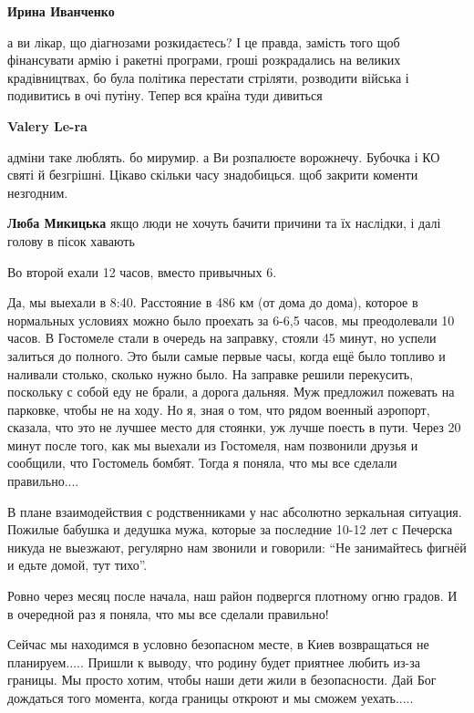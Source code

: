 \begin{itemize}
\begin{itemize}
\textbf{Ирина Иванченко} 

а ви лікар, що діагнозами розкидаєтесь? І це правда, замість того щоб
фінансувати армію і ракетні програми, гроші розкрадались на великих
крадівництвах, бо була політика перестати стріляти, розводити війська і
подивитись в очі путіну. Тепер вся країна туди дивиться

\textbf{Valery Le-ra} 

адміни таке люблять. бо мирумир. а Ви розпалюєте ворожнечу. Бубочка і КО святі й
безгрішні. Цікаво скільки часу знадобицься. щоб закрити коменти незгодним.

\textbf{Люба Микицька} якщо люди не хочуть бачити причини та їх наслідки, і далі голову в пісок хавають
\end{itemize} %

Во второй ехали 12 часов, вместо привычных 6.


Да, мы выехали в 8:40. Расстояние в 486 км (от дома до дома), которое в
нормальных условиях можно было проехать за 6-6,5 часов, мы преодолевали 10
часов. В Гостомеле стали в очередь на заправку, стояли 45 минут, но успели
залиться до полного. Это были самые первые часы, когда ещё было топливо и
наливали столько, сколько нужно было. На заправке решили перекусить, поскольку
с собой еду не брали, а дорога дальняя. Муж предложил пожевать на парковке,
чтобы не на ходу. Но я, зная о том, что рядом военный аэропорт, сказала, что
это не лучшее место для стоянки, уж лучше поесть в пути. Через 20 минут после
того, как мы выехали из Гостомеля, нам позвонили друзья и сообщили, что
Гостомель бомбят. Тогда я поняла, что мы все сделали правильно....

В плане взаимодействия с родственниками у нас абсолютно зеркальная ситуация.
Пожилые бабушка и дедушка мужа, которые за последние 10-12 лет с Печерска
никуда не выезжают, регулярно нам звонили и говорили: \enquote{Не занимайтесь
фигнёй и едьте домой, тут тихо}.

Ровно через месяц после начала, наш район подвергся плотному огню градов. И в
очередной раз я поняла, что мы все сделали правильно!

Сейчас мы находимся в условно безопасном месте, в Киев возвращаться не
планируем..... Пришли к выводу, что родину будет приятнее любить из-за границы.
Мы просто хотим, чтобы наши дети жили в безопасности. Дай Бог дождаться того
момента, когда границы откроют и мы сможем уехать.....


\end{itemize}
